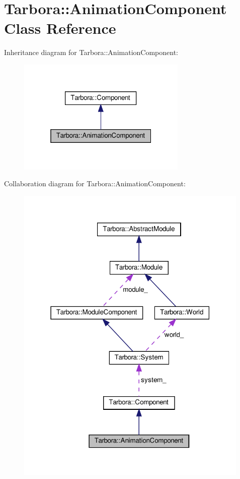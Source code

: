 \hypertarget{classTarbora_1_1AnimationComponent}{}\section{Tarbora\+:\+:Animation\+Component Class Reference}
\label{classTarbora_1_1AnimationComponent}


Inheritance diagram for Tarbora\+:\+:Animation\+Component\+:\nopagebreak
\begin{figure}[H]
\begin{center}
\leavevmode
\includegraphics[width=229pt]{classTarbora_1_1AnimationComponent__inherit__graph}
\end{center}
\end{figure}


Collaboration diagram for Tarbora\+:\+:Animation\+Component\+:\nopagebreak
\begin{figure}[H]
\begin{center}
\leavevmode
\includegraphics[width=316pt]{classTarbora_1_1AnimationComponent__coll__graph}
\end{center}
\end{figure}
